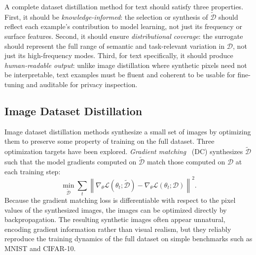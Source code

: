 \documentclass[12pt, a4paper, twoside]{book}
\numberwithin{equation}{chapter}
\theoremstyle{plain}
\theoremstyle{definition}
\theoremstyle{remark}
\newenvironment{foldable}{}{}
\begin{document}
\begin{foldable}
  A complete dataset distillation method for text should satisfy three properties.
  First, it should be \textit{knowledge-informed}: the selection or synthesis of $\tilde{\mathcal{D}}$ should reflect each example's contribution to model learning, not just its frequency or surface features.
  Second, it should ensure \textit{distributional coverage}: the surrogate should represent the full range of semantic and task-relevant variation in $\mathcal{D}$, not just its high-frequency modes.
  Third, for text specifically, it should produce \textit{human-readable output}: unlike image distillation where synthetic pixels need not be interpretable, text examples must be fluent and coherent to be usable for fine-tuning and auditable for privacy inspection.
\end{foldable}

\subsection{Image Dataset Distillation} \label{sec:26-background-datasetdistill-imagedd}
\begin{foldable}
  Image dataset distillation methods synthesize a small set of images by optimizing them to preserve some property of training on the full dataset.
  Three optimization targets have been explored.
  \textit{Gradient matching}~\cite{zhao2021dataset} (DC) synthesizes $\tilde{\mathcal{D}}$ such that the model gradients computed on $\tilde{\mathcal{D}}$ match those computed on $\mathcal{D}$ at each training step:
  \begin{equation}
    \min_{\tilde{\mathcal{D}}} \sum_{t} \left\| \nabla_\theta \mathcal{L}(\theta_t;
    \tilde{\mathcal{D}}) - \nabla_\theta \mathcal{L}(\theta_t; \mathcal{D}) \right\|^2.
    \label{eq:dc-objective}
  \end{equation}
  Because the gradient matching loss is differentiable with respect to the pixel values of the synthesized images, the images can be optimized directly by backpropagation.
  The resulting synthetic images often appear unnatural, encoding gradient information rather than visual realism, but they reliably reproduce the training dynamics of the full dataset on simple benchmarks such as MNIST and CIFAR-10.
\end{foldable}
\end{document}
